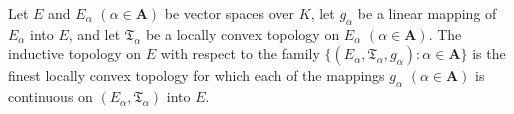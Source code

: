 Let $E$ and $E_\alpha$ $(\alpha \in \mathbf{A})$ be vector spaces over $K$, let $g_\alpha$ be a linear mapping of $E_\alpha$ into $E$, and let $\mathfrak{T}_\alpha$ be a locally convex topology on $E_\alpha$ $(\alpha \in \mathbf{A})$. The inductive topology on $E$ with respect to the family $\{(E_\alpha, \mathfrak{T}_\alpha, g_\alpha): \alpha \in \mathbf{A}\}$ is the finest locally convex topology for which each of the mappings $g_\alpha$ $(\alpha \in \mathbf{A})$ is continuous on $(E_\alpha, \mathfrak{T}_\alpha)$ into $E$.
